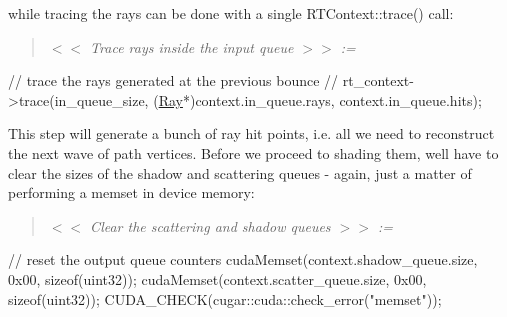 \begin{DoxyParagraph}{}
while tracing the rays can be done with a single R\+T\+Context\+::trace() call\+: ~\newline
\label{_hello_renderer_page_Trace_rays_inside_the_input_queue_anchor}%
%
 \begin{quote}
{\itshape  $<$$<$ Trace rays inside the input queue $>$$>$ \+:= }

\end{quote}

\begin{DoxyCode}
\textcolor{comment}{// trace the rays generated at the previous bounce}
\textcolor{comment}{//}
rt\_context->trace(in\_queue\_size, (\hyperlink{struct_ray}{Ray}*)context.in\_queue.rays, context.in\_queue.hits);
\end{DoxyCode}

\end{DoxyParagraph}
\begin{DoxyParagraph}{}
This step will generate a bunch of ray hit points, i.\+e. all we need to reconstruct the next wave of path vertices. Before we proceed to shading them, we\textquotesingle{}ll have to clear the sizes of the shadow and scattering queues -\/ again, just a matter of performing a memset in device memory\+: ~\newline
\label{_hello_renderer_page_Clear_the_scattering_and_shadow_queues_anchor}%
%
 \begin{quote}
{\itshape  $<$$<$ Clear the scattering and shadow queues $>$$>$ \+:= }

\end{quote}

\begin{DoxyCode}
\textcolor{comment}{// reset the output queue counters}
cudaMemset(context.shadow\_queue.size, 0x00, \textcolor{keyword}{sizeof}(uint32));
cudaMemset(context.scatter\_queue.size, 0x00, \textcolor{keyword}{sizeof}(uint32));
CUDA\_CHECK(cugar::cuda::check\_error(\textcolor{stringliteral}{"memset"}));
\end{DoxyCode}

\end{DoxyParagraph}
